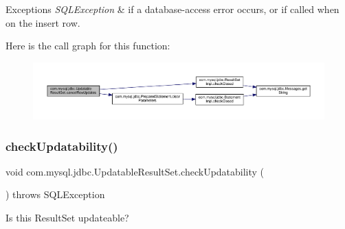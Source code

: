 \begin{DoxyExceptions}{Exceptions}
{\em S\+Q\+L\+Exception} & if a database-\/access error occurs, or if called when on the insert row. \\
\hline
\end{DoxyExceptions}
Here is the call graph for this function\+:
\nopagebreak
\begin{figure}[H]
\begin{center}
\leavevmode
\includegraphics[width=350pt]{classcom_1_1mysql_1_1jdbc_1_1_updatable_result_set_a0d0f5404555c896fc24a8ffd4605f7a7_cgraph}
\end{center}
\end{figure}
\mbox{\label{classcom_1_1mysql_1_1jdbc_1_1_updatable_result_set_a35f949d95ff9b1a60f1974f6f374a186}} 
\subsubsection{\texorpdfstring{check\+Updatability()}{checkUpdatability()}}
{\footnotesize\ttfamily void com.\+mysql.\+jdbc.\+Updatable\+Result\+Set.\+check\+Updatability (\begin{DoxyParamCaption}{ }\end{DoxyParamCaption}) throws S\+Q\+L\+Exception\hspace{0.3cm}{\ttfamily [protected]}}

Is this Result\+Set updateable?


